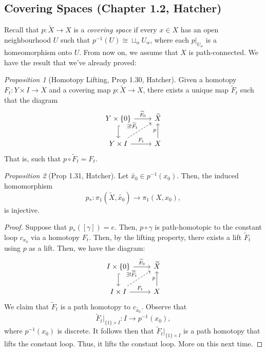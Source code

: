 \documentclass[a4paper]{report}
\theoremstyle{definition}
\theoremstyle{remark}
\theoremstyle{proposition}
\newtheorem{proposition}{Proposition}
\theoremstyle{conjecture}
\theoremstyle{lemma}
\theoremstyle{corollary}
\theoremstyle{exercise}
\begin{document}
\subsection{Covering Spaces (Chapter 1.2, Hatcher)}

Recall that $p : \widetilde{X} \to X$ is a \emph{covering space} if 
every $x\in X$ has an open neighbourhood $U$ such that 
$p^{-1}(U) \cong \sqcup_\alpha U_\alpha$, where
each $p\vert_{U_\alpha}$ is a homeomorphism onto $U$. 
From now on, we assume that $X$ is path-connected.
We have the result that we've already proved:
\begin{proposition}[Homotopy Lifting, Prop 1.30, Hatcher]
    Given a homotopy $F_t : Y \times I \to X$ and a covering map 
    $p : \widetilde{X} \to X$, there exists a 
    unique map $\widetilde{F}_t$ such that the diagram
    $$\begin{tikzcd}
        Y \times \lbrace 0 \rbrace \arrow[d, hook] \arrow[r, "\widetilde{F}_0"]   & \widetilde{X}    \\
        Y \times I \arrow[r, "F_t"] \arrow[ru, "\exists!\widetilde{F}_t", dashed] & X \arrow[u, "p"]
    \end{tikzcd}$$
    That is, such that $p \circ \widetilde{F}_t = F_t$.
\end{proposition}

\begin{proposition}[Prop 1.31, Hatcher]\label{prop13.1}
    Let $\widetilde{x_0} \in p^{-1}(x_0)$. 
    Then, the induced homomorphism 
    $$p_\ast : \pi_1(\widetilde{X}, \widetilde{x_0})  \longrightarrow \pi_1(X,x_0),$$
    is injective.
\end{proposition}

\begin{proof}
    Suppose that $p_\ast([\gamma]) = e$. Then, $p \circ \gamma$ is 
    path-homotopic to the constant loop $c_{x_0}$ via a homotopy 
    $F_t$. Then, by the lifting property, there exists a lift 
    $\widetilde{F}_t$ using $p$ as a lift. Then, we have the diagram:
    $$\begin{tikzcd}
        I \times \lbrace 0 \rbrace \arrow[d, hook] \arrow[r, "\widetilde{F}_0"]   & \widetilde{X}    \\
        I \times I \arrow[r, "F_t"] \arrow[ru, "\exists!\widetilde{F}_t", dashed] & X \arrow[u, "p"]
    \end{tikzcd}$$
    We claim that $\widetilde{F}_t$ is a path homotopy to 
    $c_{\widetilde{x_0}}$. Observe that 
    $$\widetilde{F}_t \vert_{\lbrace 1\rbrace \times I} : I \longrightarrow p^{-1}(x_0),$$
    where $p^{-1}(x_0)$ is discrete. It follows then that 
    $\widetilde{F}_t\vert_{\lbrace 1\rbrace \times I}$ is a path homotopy 
    that lifts the constant loop. Thus, it lifts the constant loop. More on this next time.
\end{proof}
\end{document}
